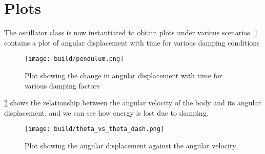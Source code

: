 \documentclass[12pt,english]{article}
\begin{document}
\section{Plots}
  The oscillator class is now instantiated to obtain plots under various
  scenarios. \cref{fig:plot_pendulum} contains a plot of angular displacement with time for 
  various damping conditions
  \begin{figure}[h!]
    \centering
    \texttt{[image: build/pendulum.png]}
    \caption{Plot showing the change in angular displacement with time for various damping factors}
    \label{fig:plot_pendulum}
  \end{figure}

  
  \cref{fig:plot_theta_relation} shows the relationship between the angular velocity of the body and its
  angular displacement, and we can see how energy is lost due to damping.
  \begin{figure}[h!]
    \centering
    \texttt{[image: build/theta\_vs\_theta\_dash.png]}
    \caption{Plot showing the angular displacement against the angular velocity}
    \label{fig:plot_theta_relation}
  \end{figure}

\printbibliography
\end{document}
